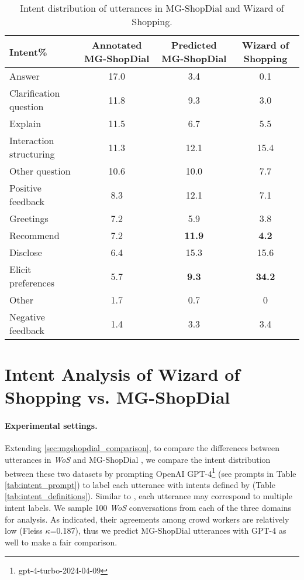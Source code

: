 \begin{table*}[t]  \small
\centering
\renewcommand{\arraystretch}{1.0} %
\begin{tabular}{lccc}
\hline
\textbf{Intent\%} & \textbf{Annotated MG-ShopDial} & \textbf{Predicted MG-ShopDial} & \textbf{Wizard of Shopping}\\ \hline
Answer & 17.0 & 3.4 & 0.1\\ \hline 
Clarification question & 11.8 & 9.3 & 3.0\\ \hline 
Explain & 11.5 & 6.7 & 5.5 \\ \hline 
Interaction structuring & 11.3 & 12.1 & 15.4\\ \hline 
Other question & 10.6 & 10.0 & 7.7 \\ \hline 
Positive feedback & 8.3 & 12.1 & 7.1 \\ \hline 
Greetings & 7.2 & 5.9 & 3.8 \\ \hline 
Recommend & 7.2 & \textbf{11.9} & \textbf{4.2} \\ \hline 
Disclose  & 6.4 & 15.3 & 15.6 \\ \hline 
Elicit preferences & 5.7 & \textbf{9.3} & \textbf{34.2}\\ \hline 
Other & 1.7 & 0.7 & 0\\ \hline 
Negative feedback & 1.4 & 3.3 & 3.4\\ \hline 

\end{tabular}
\caption{Intent distribution of utterances in MG-ShopDial \cite{Bernard:2023:SIGIR} and Wizard of Shopping.}
\label{tab:intent}
\end{table*}

\section{Intent Analysis of Wizard of Shopping vs. MG-ShopDial}
\label{sec:intent_analysis}
\paragraph{Experimental settings.} Extending \ref{sec:mgshopdial_comparison}, to compare the differences between utterances in \textit{WoS} and MG-ShopDial \cite{Bernard:2023:SIGIR}, we compare the intent distribution between these two datasets by prompting OpenAI GPT-4\footnote{gpt-4-turbo-2024-04-09} (see prompts in Table \ref{tab:intent_prompt}) to label each utterance with intents defined by \citet{Bernard:2023:SIGIR} (Table \ref{tab:intent_definitions}). Similar to \citet{Bernard:2023:SIGIR}, each utterance may correspond to multiple intent labels. We sample 100 \textit{WoS} conversations from each of the three domains for analysis. As \citet{Bernard:2023:SIGIR} indicated, their agreements among crowd workers are relatively low (Fleiss $\kappa$=0.187), thus we predict MG-ShopDial utterances with GPT-4 as well to make a fair comparison.

